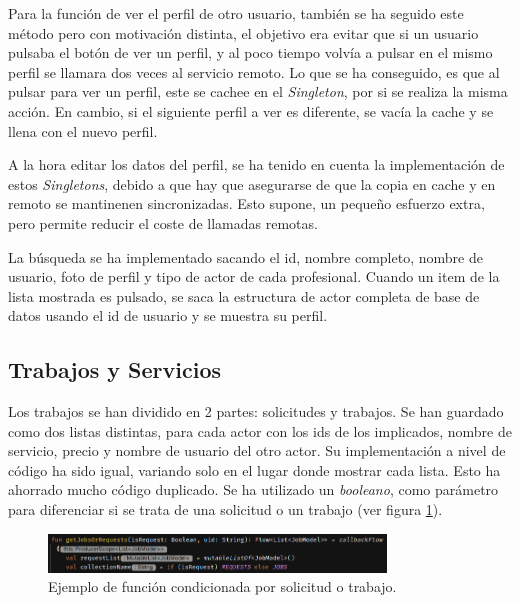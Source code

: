 Para la función de ver el perfil de otro usuario, también se ha seguido este método pero con motivación distinta, el objetivo era evitar que si un usuario pulsaba el botón de ver un perfil, y al poco tiempo volvía a pulsar en el mismo perfil se llamara dos veces al servicio remoto. Lo que se ha conseguido, es que al pulsar para ver un perfil, este se cachee en el \textit{Singleton}, por si se realiza la misma acción. En cambio, si el siguiente perfil a ver es diferente, se vacía la cache y se llena con el nuevo perfil.

A la hora editar los datos del perfil, se ha tenido en cuenta la implementación de estos \textit{Singletons}, debido a que hay que asegurarse de que la copia en cache y en remoto se mantinenen sincronizadas. Esto supone, un pequeño esfuerzo extra, pero permite reducir el coste de llamadas remotas.

La búsqueda se ha implementado sacando el id, nombre completo, nombre de usuario, foto de perfil y tipo de actor de cada profesional. Cuando un item de la lista mostrada es pulsado, se saca la estructura de actor completa de base de datos usando el id de usuario y se muestra su perfil. 

\subsection{Trabajos y Servicios} 
Los trabajos se han dividido en 2 partes: solicitudes y trabajos. Se han guardado como dos listas distintas, para cada actor con los ids de los implicados, nombre de servicio, precio y nombre de usuario del otro actor. Su implementación a nivel de código ha sido igual, variando solo en el lugar donde mostrar cada lista. Esto ha ahorrado mucho código duplicado. Se ha utilizado un \textit{booleano}, como parámetro para diferenciar si se trata de una solicitud o un trabajo (ver figura \ref{fig:getJobOrRequest}).
\begin{figure}[h]
    \centering
    \includegraphics[width = 0.8\textwidth]{Imagenes/Fuentes/getJobOrRequest.png}
    \caption{Ejemplo de función condicionada por solicitud o trabajo.}
    \label{fig:getJobOrRequest}
\end{figure}

